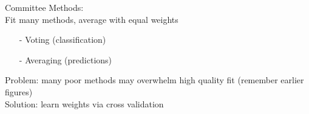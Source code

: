 \documentclass{beamer}
\begin{document}
\begin{frame}


Committee Methods:\\

Fit many methods, average with equal weights 

\begin{itemize}
\item[-] Voting (classification)
\item[-] Averaging (predictions) 
\end{itemize}


Problem: many poor methods may overwhelm high quality fit (remember earlier figures)\\
Solution: learn weights via cross validation


\end{frame}
\end{document}

